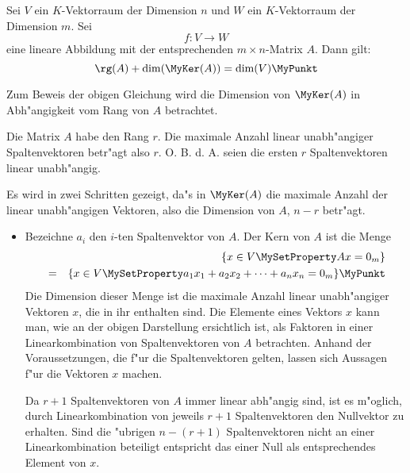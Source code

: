 \begin{lemma}
\label{SatzDimKer}
    Sei $V$ ein $K$-Vektorraum der Dimension $n$ und
    $W$ ein $K$-Vektorraum der Dimension $m$. Sei
    \[ f: V \rightarrow W \] eine lineare Abbildung mit der
    entsprechenden $m \times n$-Matrix $A$. Dann gilt:
    \[ \rg(A) + \dim(\MyKer(A)) = \dim(V) \MyPunkt \]
\end{lemma}
\begin{beweis}
    Zum Beweis der obigen Gleichung wird die Dimension von 
    $\MyKer(A)$ in Abh"angigkeit vom Rang von $A$ betrachtet.

    Die Matrix $A$ habe den Rang $r$. Die maximale Anzahl linear
    unabh"angiger Spaltenvektoren betr"agt also $r$. O. B. d. A. seien
    die ersten $r$ Spaltenvektoren linear unabh"angig.
    
    Es wird in zwei Schritten gezeigt, da"s in $\MyKer(A)$ die maximale 
    Anzahl der linear unabh"angigen Vektoren, also die Dimension von $A$,
    $n-r$ betr"agt.
    
    \begin{itemize}
    \item Bezeichne $a_i$ den $i$-ten Spaltenvektor von $A$. Der Kern 
          von $A$ ist die Menge
          \begin{eqnarray*}
              & & \{ x \in V \MySetProperty A x = 0_m \} \\
              & = & \{ x \in V \MySetProperty
               a_1 x_1 + a_2 x_2 + \cdots + a_n x_n = 0_m \} \MyPunkt
          \end{eqnarray*}
          Die Dimension dieser Menge ist die maximale Anzahl linear
          unabh"angiger Vektoren $x$, die in ihr enthalten sind. Die
          Elemente eines Vektors $x$ kann man, wie an der obigen
          Darstellung ersichtlich ist, als Faktoren in einer
          Linearkombination von Spaltenvektoren von $A$ betrachten.
          Anhand der Voraussetzungen, die f"ur die Spaltenvektoren
          gelten, lassen sich Aussagen f"ur die Vektoren $x$ machen.
          
          Da $r+1$
          Spaltenvektoren von $A$ immer linear abh"angig sind, ist es
          m"oglich, durch Linearkombination von jeweils $r+1$ 
          Spaltenvektoren den Nullvektor zu erhalten. Sind die "ubrigen 
          $n-(r+1)$ Spaltenvektoren nicht an einer Linearkombination 
          beteiligt entspricht das einer Null als entsprechendes Element 
          von $x$.
          

\end{itemize}
\end{beweis}
